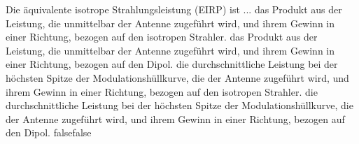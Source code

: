     {Die äquivalente isotrope Strahlungsleistung (EIRP) ist ...}
    {das Produkt aus der Leistung, die unmittelbar der Antenne zugeführt wird, und ihrem Gewinn in einer Richtung, bezogen auf den isotropen Strahler.}
    {das Produkt aus der Leistung, die unmittelbar der Antenne zugeführt wird, und ihrem Gewinn in einer Richtung, bezogen auf den Dipol.}
    {die durchschnittliche Leistung bei der höchsten Spitze der Modulationshüllkurve, die der Antenne zugeführt wird, und ihrem Gewinn in einer Richtung, bezogen auf den isotropen Strahler.}
    {die durchschnittliche Leistung bei der höchsten Spitze der Modulationshüllkurve, die der Antenne zugeführt wird, und ihrem Gewinn in einer Richtung, bezogen auf den Dipol.}
    {false}{false}